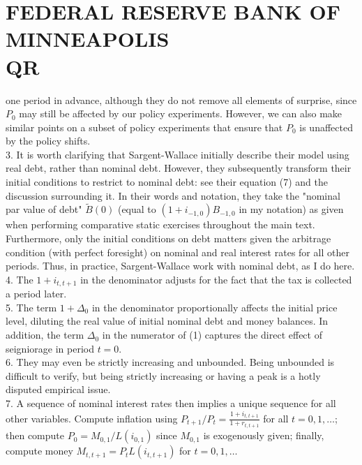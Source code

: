 \documentclass[10pt]{article}
\begin{document}
\section*{FEDERAL RESERVE BANK OF MINNEAPOLIS \\
 QR}
one period in advance, although they do not remove all elements of surprise, since $P_{0}$ may still be affected by our policy experiments. However, we can also make similar points on a subset of policy experiments that ensure that $P_{0}$ is unaffected by the policy shifts.\\
3. It is worth clarifying that Sargent-Wallace initially describe their model using real debt, rather than nominal debt. However, they subsequently transform their initial conditions to restrict to nominal debt: see their equation (7) and the discussion surrounding it. In their words and notation, they take the "nominal par value of debt" $\tilde{B}(0)$ (equal to $\left(1+i_{-1,0}\right) B_{-1,0}$ in my notation) as given when performing comparative static exercises throughout the main text. Furthermore, only the initial conditions on debt matters given the arbitrage condition (with perfect foresight) on nominal and real interest rates for all other periods. Thus, in practice, Sargent-Wallace work with nominal debt, as I do here.\\
4. The $1+i_{t, t+1}$ in the denominator adjusts for the fact that the tax is collected a period later.\\
5. The term $1+\Delta_{0}$ in the denominator proportionally affects the initial price level, diluting the real value of initial nominal debt and money balances. In addition, the term $\Delta_{0}$ in the numerator of (1) captures the direct effect of seigniorage in period $t=0$.\\
6. They may even be strictly increasing and unbounded. Being unbounded is difficult to verify, but being strictly increasing or having a peak is a hotly disputed empirical issue.\\
7. A sequence of nominal interest rates then implies a unique sequence for all other variables. Compute inflation using $P_{t+1} / P_{t}=\frac{1+i_{t, t+1}}{1+r_{t, t+1}}$ for all $t=0,1, \ldots$; then compute $P_{0}=M_{0,1} / L\left(i_{0,1}\right)$ since $M_{0,1}$ is exogenously given; finally, compute money $M_{t, t+1}=P_{t} L\left(i_{t, t+1}\right)$ for $t=0,1, \ldots$
\end{document}
